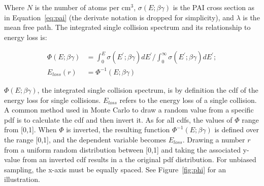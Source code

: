 Where $N$ is the number of atoms per cm$^{3}$, $\sigma(E; \beta \gamma)$ is the \ac{PAI} cross section as in Equation~\ref{eq:pai} (the derivate notation is dropped for simplicity), and $\lambda$ is the mean free path. The integrated single collision spectrum and its relationship to energy loss is:

\begin{equation}
\begin{split}
\Phi(E; \beta \gamma) &= \int_{0}^{E} \sigma(E^{\prime}; \beta \gamma) dE^{\prime} \big / \int_{0}^{\infty} \sigma(E^{\prime}; \beta \gamma) dE^{\prime} ;\\
E_{loss}(r)  &= \Phi^{-1}(E; \beta \gamma) 
\end{split}
\end{equation}

$\Phi(E; \beta \gamma)$, the integrated single collision spectrum, is by definition the \ac{cdf} of the energy loss for single collisions. $E_{loss}$ refers to the energy loss of a single collision. A common method used in Monte Carlo to draw a random value from a specific \ac{pdf} is to calculate the \ac{cdf} and then invert it. As for all \ac{cdf}s, the values of $\Phi$ range from [0,1]. When $\Phi$ is inverted, the resulting function $\Phi^{-1}(E; \beta \gamma)$ is defined over the range [0,1], and the dependent variable becomes $E_{loss}$. Drawing a number $r$ from a uniform random distribution between [0,1] and taking the associated y-value from an inverted \ac{cdf} results in a the original \ac{pdf} distribution. For unbiased sampling, the x-axis must be equally spaced. See Figure~\ref{fig:phi} for an illustration.

